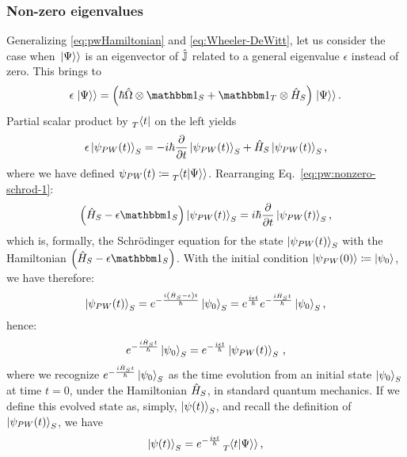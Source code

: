 \subsubsection{Non-zero eigenvalues}
Generalizing \eqref{eq:pwHamiltonian} and \eqref{eq:Wheeler-DeWitt}, let us consider the case when
$\left.\left| \Psi \right\rangle\right\rangle$ is an eigenvector of $\hat{\mathbb{J}}$ related to a general eigenvalue $\epsilon$
instead of zero. This brings to
\begin{equation}\label{eq:pw:non0e:first}
  \epsilon \dket{\Psi} = \qty(\hbar\op{\Omega} \ox \idop_S + \idop_T \ox \op{H}_S) \dket{\Psi} \text{.}
\end{equation}
Partial scalar product by $\prescript{}{T}{\bra{t}}$ on the left yields
\begin{equation}\label{eq:pw:nonzero-schrod-1}
  \epsilon\ket{\psi_{PW}(t)}_{S} = -i\hbar\pdv{t}\ket{\psi_{PW}(t)}_{S} + \hat{H}_S\ket{\psi_{PW}(t)}_{S}
  \text{,}
\end{equation}
where we have defined $\psi_{PW}(t) \coloneqq \prescript{}{T}{\!\left.\left\langle t \middle| \Psi \right\rangle\right\rangle}$.
Rearranging Eq.~\eqref{eq:pw:nonzero-schrod-1}:
\begin{equation}\label{eq:pw:nonzero-schrod-2}
   \qty(\op{H}_S - \epsilon \idop_{S}) \ket{\psi_{PW}(t)}_{S} = i\hbar\pdv{t}\ket{\psi_{PW}(t)}_{S}
   \text{,}
\end{equation}
which is, formally, the Schr\"{o}dinger equation
for the state $\ket{\psi_{PW}(t)}_{S}$ with
the Hamiltonian $\qty(\op{H}_S - \epsilon \idop_{S})$.
With the initial condition $\ket{\psi_{PW}(0)} \coloneqq \ket{\psi_0}$, we have therefore:
\begin{equation}\label{eq:pw:non0e:last}
  \ket{\psi_{PW}(t)}_S =
  e^{-\frac{i \qty(\hat{H}_{S} - \epsilon) t}{\hbar}} \ket{\psi_0}_S =
  e^{\frac{i \epsilon t}{\hbar}} e^{-\frac{i \hat{H}_{S} t}{\hbar}} \ket{\psi_0}_S
  \text{,}
\end{equation}
hence:
\begin{equation}
  e^{-\frac{i \hat{H}_{S} t}{\hbar}} \ket{\psi_0}_S = e^{-\frac{i \epsilon t}{\hbar}} \ket{\psi_{PW}(t)}_S
  \,\text{,}
\end{equation}
where we recognize $e^{-\frac{i \hat{H}_{S} t}{\hbar}} \ket{\psi_0}_S$ as the time evolution
from an initial state $\ket{\psi_0}_S$ at time $t = 0$,
under the Hamiltonian $\hat{H}_S$,
in standard quantum mechanics.
If we define this evolved state as, simply, $\ket{\psi(t)}_S$, and recall the definition of $\ket{\psi_{PW}(t)}_S$,
we have
\begin{equation}
  \ket{\psi(t)}_S = e^{-\frac{i \epsilon t}{\hbar}} \prescript{}{T}{\!\left.\left\langle t \middle| \Psi \right\rangle\right\rangle} \, \text{,}
\end{equation}
